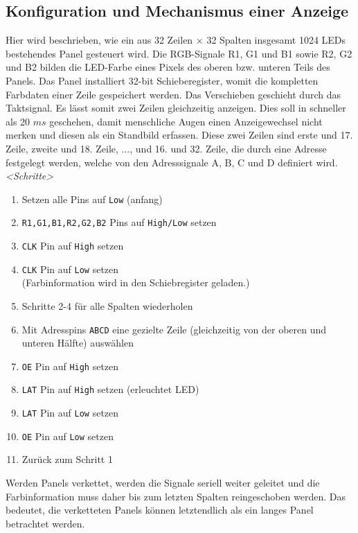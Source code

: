 \subsection{Konfiguration und Mechanismus einer Anzeige}
Hier wird beschrieben, wie ein aus 32 Zeilen $\times$ 32 Spalten insgesamt 1024 LEDs bestehendes Panel gesteuert wird. Die  RGB-Signale R1, G1 und B1 sowie R2, G2 und B2 bilden die LED-Farbe eines Pixels des oberen bzw. unteren Teils des Panels. Das Panel installiert 32-bit Schieberegister, womit die kompletten Farbdaten einer Zeile gespeichert werden. Das Verschieben geschieht durch das Taktsignal. Es lässt somit zwei Zeilen gleichzeitig anzeigen. Dies soll in schneller als 20 $ms$ geschehen, damit menschliche Augen einen Anzeigewechsel nicht merken und diesen als ein Standbild erfassen. Diese zwei Zeilen sind erste und 17. Zeile, zweite und 18. Zeile, ..., und 16. und 32. Zeile, die durch eine Adresse festgelegt werden, welche von den Adresssignale A, B, C und D definiert wird.\\

\emph{<Schritte>}
\begin{enumerate}
	\item Setzen alle Pins auf \texttt{Low} (anfang)
	\item \texttt{R1,G1,B1,R2,G2,B2} Pins auf \texttt{High/Low} setzen
	\item \texttt{CLK} Pin auf \texttt{High} setzen
	\item \texttt{CLK} Pin auf \texttt{Low} setzen \\
	(Farbinformation wird in den Schiebregister geladen.)
	\item Schritte 2-4 für alle Spalten wiederholen
	\item Mit Adresspins \texttt{ABCD} eine gezielte Zeile (gleichzeitig von der oberen und unteren Hälfte) auswählen
	\item \texttt{OE} Pin auf \texttt{High} setzen
	\item \texttt{LAT} Pin auf \texttt{High} setzen (erleuchtet LED)
	\item \texttt{LAT} Pin auf \texttt{Low} setzen
	\item \texttt{OE} Pin auf \texttt{Low} setzen
	\item Zurück zum Schritt 1
\end{enumerate}

Werden Panels verkettet, werden die Signale seriell weiter geleitet und die Farbinformation muss daher bis zum letzten Spalten reingeschoben werden. Das bedeutet, die verketteten Panels können letztendlich als ein langes Panel betrachtet werden.

